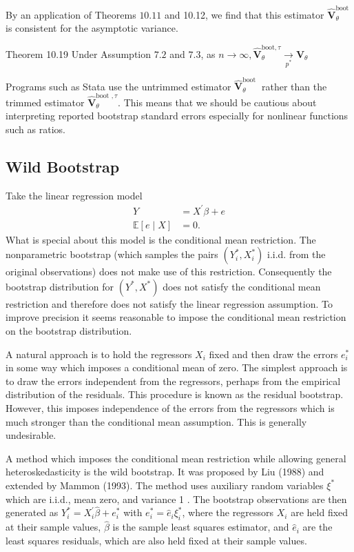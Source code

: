 \documentclass[10pt]{article}
\begin{document}
By an application of Theorems $10.11$ and 10.12, we find that this estimator $\widehat{\boldsymbol{V}}_{\theta}^{\text {boot }}$ is consistent for the asymptotic variance.

Theorem 10.19 Under Assumption $7.2$ and $7.3$, as $n \rightarrow \infty, \widehat{\boldsymbol{V}}_{\theta}^{\mathrm{boot}, \tau} \underset{p^{*}}{\longrightarrow} \boldsymbol{V}_{\theta}$

Programs such as Stata use the untrimmed estimator $\widehat{\boldsymbol{V}}_{\theta}^{\text {boot }}$ rather than the trimmed estimator $\widehat{\boldsymbol{V}}_{\theta}^{\text {boot }, \tau}$. This means that we should be cautious about interpreting reported bootstrap standard errors especially for nonlinear functions such as ratios.

\subsection{Wild Bootstrap}
Take the linear regression model
$$
\begin{aligned}
Y &=X^{\prime} \beta+e \\
\mathbb{E}[e \mid X] &=0 .
\end{aligned}
$$
What is special about this model is the conditional mean restriction. The nonparametric bootstrap (which samples the pairs $\left(Y_{i}^{*}, X_{i}^{*}\right)$ i.i.d. from the original observations) does not make use of this restriction. Consequently the bootstrap distribution for $\left(Y^{*}, X^{*}\right)$ does not satisfy the conditional mean restriction and therefore does not satisfy the linear regression assumption. To improve precision it seems reasonable to impose the conditional mean restriction on the bootstrap distribution.

A natural approach is to hold the regressors $X_{i}$ fixed and then draw the errors $e_{i}^{*}$ in some way which imposes a conditional mean of zero. The simplest approach is to draw the errors independent from the regressors, perhaps from the empirical distribution of the residuals. This procedure is known as the residual bootstrap. However, this imposes independence of the errors from the regressors which is much stronger than the conditional mean assumption. This is generally undesirable.

A method which imposes the conditional mean restriction while allowing general heteroskedasticity is the wild bootstrap. It was proposed by Liu (1988) and extended by Mammon (1993). The method uses auxiliary random variables $\xi^{*}$ which are i.i.d., mean zero, and variance 1 . The bootstrap observations are then generated as $Y_{i}^{*}=X_{i}^{\prime} \widehat{\beta}+e_{i}^{*}$ with $e_{i}^{*}=\widehat{e}_{i} \xi_{i}^{*}$, where the regressors $X_{i}$ are held fixed at their sample values, $\widehat{\beta}$ is the sample least squares estimator, and $\widehat{e}_{i}$ are the least squares residuals, which are also held fixed at their sample values.
\end{document}
